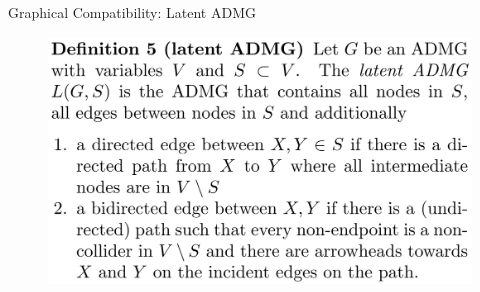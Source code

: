 \documentclass{beamer}
\begin{document}
\begin{frame}{Graphical Compatibility: Latent ADMG}
	\begin{figure}
		\centering
		\includegraphics[scale=0.15]{imgs/def_5.png}
	\end{figure}
\end{frame}
\end{document}
